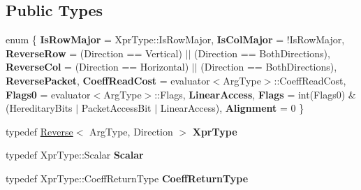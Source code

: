\subsection*{Public Types}
\begin{DoxyCompactItemize}
\item 
\mbox{\label{struct_eigen_1_1internal_1_1unary__evaluator_3_01_reverse_3_01_arg_type_00_01_direction_01_4_01_4_a7a5eb7a61014a49db3bf0a0a17ca703c}} 
enum \{ \newline
{\bfseries Is\+Row\+Major} = Xpr\+Type\+::Is\+Row\+Major, 
{\bfseries Is\+Col\+Major} = !\+Is\+Row\+Major, 
{\bfseries Reverse\+Row} = (Direction == Vertical) $\vert$$\vert$ (Direction == Both\+Directions), 
{\bfseries Reverse\+Col} = (Direction == Horizontal) $\vert$$\vert$ (Direction == Both\+Directions), 
\newline
{\bfseries Reverse\+Packet}, 
{\bfseries Coeff\+Read\+Cost} = evaluator$<$Arg\+Type$>$\+::Coeff\+Read\+Cost, 
{\bfseries Flags0} = evaluator$<$Arg\+Type$>$\+::Flags, 
{\bfseries Linear\+Access}, 
\newline
{\bfseries Flags} = int(Flags0) \& (Hereditary\+Bits $\vert$ Packet\+Access\+Bit $\vert$ Linear\+Access), 
{\bfseries Alignment} = 0
 \}
\item 
\mbox{\label{struct_eigen_1_1internal_1_1unary__evaluator_3_01_reverse_3_01_arg_type_00_01_direction_01_4_01_4_adbfd9e3b3db03f682acfa5171fbc2846}} 
typedef \mbox{\hyperlink{class_eigen_1_1_reverse}{Reverse}}$<$ Arg\+Type, Direction $>$ {\bfseries Xpr\+Type}
\item 
\mbox{\label{struct_eigen_1_1internal_1_1unary__evaluator_3_01_reverse_3_01_arg_type_00_01_direction_01_4_01_4_afbdcce3facf909199fafefca9b77371f}} 
typedef Xpr\+Type\+::\+Scalar {\bfseries Scalar}
\item 
\mbox{\label{struct_eigen_1_1internal_1_1unary__evaluator_3_01_reverse_3_01_arg_type_00_01_direction_01_4_01_4_acb14f9a54c1ea449e9283a449080084e}} 
typedef Xpr\+Type\+::\+Coeff\+Return\+Type {\bfseries Coeff\+Return\+Type}
\end{DoxyCompactItemize}
